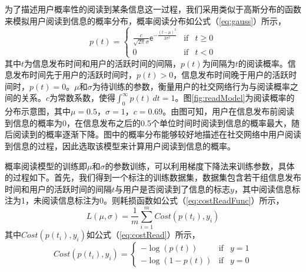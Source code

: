 为了描述用户概率性的阅读到某条信息这一过程，我们采用类似于高斯分布的函数来模拟用户阅读到信息的概率分布，概率阅读分布如公式（\ref{eq:gauss}）所示，
\begin{equation}
\label{eq:gauss}
	p\left(t\right) = \left\{ \begin{array}{rcl} \frac{c}{\sqrt{2 \pi} \sigma}\mathsf{e}^{-\frac{\left(t-\mu\right)^2}{2{\sigma}^2}} & \mbox{if} & t \geq 0 \\ 0 & \mbox{if} & t < 0  \end{array} \right.
\end{equation}
其中$t$为信息发布时间和用户的活跃时间的间隔，$p\left(t\right)$为间隔为$t$的阅读概率。信息发布时间先于用户的活跃时间时，$p\left(t\right) > 0$，信息发布时间晚于用户的活跃时间时，$p\left(t\right) = 0$。$\mu$和$\sigma$为待训练的参数，衡量用户的社交网络行为与阅读概率之间的关系。$c$为常数系数，使得$\int _0^\infty p\left(t\right) \,dt = 1$。图\ref{fig:readModel}为阅读概率的分布示意图，其中$\mu = 0.5$，$\sigma = 1$，$c = 0.69$。由图可知，用户在信息发布前阅读到信息的概率为0，在信息发布之后的0.5个单位时间时阅读到信息的概率最大，随后阅读到的概率逐渐下降。图中的概率分布能够较好地描述在社交网络中用户阅读到信息的过程，因此选取该模型来计算用户阅读到信息的概率。

概率阅读模型的训练即$\mu$和$\sigma$的参数训练，可以利用梯度下降法来训练参数，具体的过程如下。首先，我们得到一个标注的训练数据集，数据集包含若干组信息发布时间和用户的活跃时间的间隔$t$与用户是否阅读到了信息的标志$y$，其中阅读信息标注为1，未阅读信息标注为0。则耗损函数如公式（\ref{eq:costReadFunc}）所示，
\begin{equation}
\label{eq:costReadFunc}
	L\left(\mu, \sigma \right) = \frac{1}{m}\sum_{i=1}^m {Cost\left( p\left(t_i\right), y_i\right)}
\end{equation}
其中$Cost\left( p\left(t_i\right), y_i\right)$如公式（\ref{eq:costRead}）所示，
\begin{equation}
\label{eq:costRead}
	Cost\left( p\left(t_i\right), y_i\right) = \left\{ \begin{array}{rcl} -\log \left(p\left(t\right)\right) & \mbox{if} & y=1 \\ -\log \left(1 - p\left(t\right) \right) & \mbox{if} & y=0  \end{array} \right.
\end{equation}


